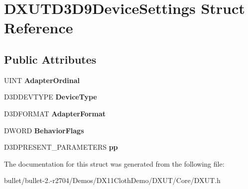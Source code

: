 \hypertarget{struct_d_x_u_t_d3_d9_device_settings}{\section{D\+X\+U\+T\+D3\+D9\+Device\+Settings Struct Reference}
\label{struct_d_x_u_t_d3_d9_device_settings}
}
\subsection*{Public Attributes}
\begin{DoxyCompactItemize}
\item 
\hypertarget{struct_d_x_u_t_d3_d9_device_settings_a7dc8a0f8c612ef50bc3e80bbc3651a69}{U\+I\+N\+T {\bfseries Adapter\+Ordinal}}\label{struct_d_x_u_t_d3_d9_device_settings_a7dc8a0f8c612ef50bc3e80bbc3651a69}

\item 
\hypertarget{struct_d_x_u_t_d3_d9_device_settings_a7b6c56f9bb8d2b2a79aed317a813d81b}{D3\+D\+D\+E\+V\+T\+Y\+P\+E {\bfseries Device\+Type}}\label{struct_d_x_u_t_d3_d9_device_settings_a7b6c56f9bb8d2b2a79aed317a813d81b}

\item 
\hypertarget{struct_d_x_u_t_d3_d9_device_settings_a85814b4ae7cf7477387656ed4c66696f}{D3\+D\+F\+O\+R\+M\+A\+T {\bfseries Adapter\+Format}}\label{struct_d_x_u_t_d3_d9_device_settings_a85814b4ae7cf7477387656ed4c66696f}

\item 
\hypertarget{struct_d_x_u_t_d3_d9_device_settings_ab972a281b5cdaffe2179f49c83808ce1}{D\+W\+O\+R\+D {\bfseries Behavior\+Flags}}\label{struct_d_x_u_t_d3_d9_device_settings_ab972a281b5cdaffe2179f49c83808ce1}

\item 
\hypertarget{struct_d_x_u_t_d3_d9_device_settings_a6fc97aa2a61c1956ebcc5783bac0cbd8}{D3\+D\+P\+R\+E\+S\+E\+N\+T\+\_\+\+P\+A\+R\+A\+M\+E\+T\+E\+R\+S {\bfseries pp}}\label{struct_d_x_u_t_d3_d9_device_settings_a6fc97aa2a61c1956ebcc5783bac0cbd8}

\end{DoxyCompactItemize}


The documentation for this struct was generated from the following file\+:\begin{DoxyCompactItemize}
\item 
bullet/bullet-\/2.-\/r2704/\+Demos/\+D\+X11\+Cloth\+Demo/\+D\+X\+U\+T/\+Core/D\+X\+U\+T.\+h\end{DoxyCompactItemize}
